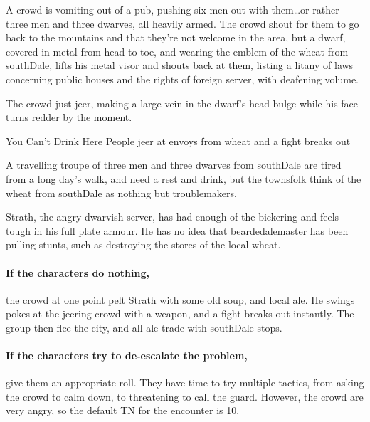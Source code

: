 \begin{boxtext}

  A crowd is vomiting out of a pub, pushing six men out with them\ldots or rather three men and three dwarves, all heavily armed.
  The crowd shout for them to go back to the mountains and that they're not welcome in the area, but a dwarf, covered in metal from head to toe, and wearing the emblem of the \gls{wheat} from \gls{southDale}, lifts his metal visor and shouts back at them, listing a litany of laws concerning public houses and the rights of foreign \gls{server}, with deafening volume.

  The crowd just jeer, making a large vein in the dwarf's head bulge while his face turns redder by the moment.

\end{boxtext}

{You Can't Drink Here}%
{People jeer at envoys from  \gls{wheat} and a fight breaks out}%

A travelling troupe of three men and three dwarves from \gls{southDale} are tired from a long day's walk, and need a rest and drink, but the townsfolk think of the \gls{wheat} from \gls{southDale} as nothing but troublemakers.

Strath, the angry dwarvish \gls{server}, has had enough of the bickering and feels tough in his full plate armour.
He has no idea that \gls{beardedalemaster} has been pulling stunts, such as destroying the stores of the local \gls{wheat}.

\paragraph{If the characters do nothing,}
the crowd at one point pelt Strath with some old soup, and local ale.
He swings pokes at the jeering crowd with a weapon, and a fight breaks out instantly.
The group then flee the city, and all ale trade with \gls{southDale} stops.

\paragraph{If the characters try to de-escalate the problem,}
give them an appropriate roll.
They have time to try multiple tactics, from asking the crowd to calm down, to threatening to call the guard.
However, the crowd are very angry, so the default TN for the encounter is 10.


